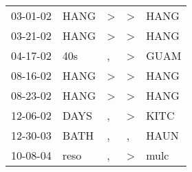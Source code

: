 \begin{supertabular}{lllll}
 03-01-02 &  HANG &  \textgreater &     \textgreater &  HANG \\
 03-21-02 &  HANG &  \textgreater &     \textgreater &  HANG \\
 04-17-02 &   40s &             , &     \textgreater &  GUAM \\
 08-16-02 &  HANG &  \textgreater &     \textgreater &  HANG \\
 08-23-02 &  HANG &  \textgreater &     \textgreater &  HANG \\
 12-06-02 &  DAYS &             , &     \textgreater &  KITC \\
 12-30-03 &  BATH &             , &                , &  HAUN \\
 10-08-04 &  reso &             , &     \textgreater &  mulc \\
\end{supertabular}
